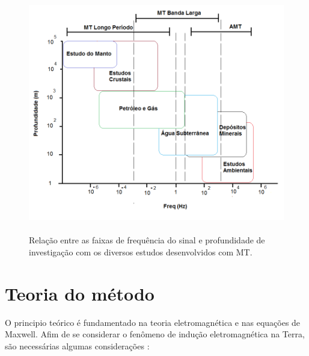  
\begin{figure}[!h]
\centering \includegraphics[width=12.5cm,height=10.5cm]{Figs/faixadefrequencias}
\caption{Relação entre as faixas de frequência do sinal e profundidade de investigação com os diversos estudos desenvolvidos com MT.}
\label{exploracao}
\end{figure}


\pagebreak

\section{Teoria do método}
O principio teórico é fundamentado na teoria eletromagnética e nas equações de Maxwell. Afim de se considerar o fenômeno de indução eletromagnética na Terra, são necessárias algumas considerações \cite{simpson2005practical}:

